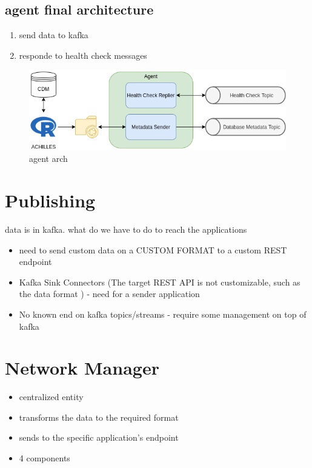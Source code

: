 
\subsection{agent final architecture}
\begin{enumerate}
    \item send data to kafka
    \item responde to health check messages
\end{enumerate}

\begin{figure}[h]
    \center
    \includegraphics[width=\textwidth]{agent-architecture}
    \caption{agent arch}
    \label{fig:agent-architecture}
\end{figure}

\section{Publishing}

data is in kafka. what do we have to do to reach the applications

\begin{itemize}
    \item need to send custom data on a CUSTOM FORMAT to a custom REST endpoint
    \item Kafka Sink Connectors (The target REST API is not customizable, such as the data format ) - need for a sender application
    \item No known end on kafka topics/streams - require some management on top of kafka
\end{itemize}

\section{Network Manager}  %
\begin{itemize}
    \item centralized entity
    \item transforms the data to the required format
    \item sends to the specific application's endpoint
    \item 4 components
\end{itemize}

